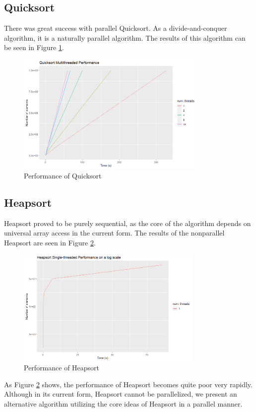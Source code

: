 \documentclass[conference]{IEEEtran}
\begin{document}
	\subsection{Quicksort}
	There was great success with parallel Quicksort.
	As a divide-and-conquer algorithm, it is a naturally parallel algorithm.
	The results of this algorithm can be seen in Figure \ref{qck_per}.
	\begin{figure}[h]
		\includegraphics[width=9.25cm]{qs_mt.png}
		\caption{Performance of Quicksort}
		\label{qck_per}
	\end{figure}
	
	
	\subsection{Heapsort}
	Heapsort proved to be purely sequential, as the core of the algorithm depends on universal array access in the current form.
	The results of the nonparallel Heapsort are seen in Figure \ref{hs_per}.
	\begin{figure}[h]
		\includegraphics[width=9cm]{hs_per.png}
		\caption{Performance of Heapsort}
		\label{hs_per}
	\end{figure}
	As Figure \ref{hs_per} shows, the performance of Heapsort becomes quite poor very rapidly.
	Although in its current form, Heapsort cannot be parallelized, we present an alternative algorithm utilizing the core ideas of Heapsort in a parallel manner.
	
\end{document}
